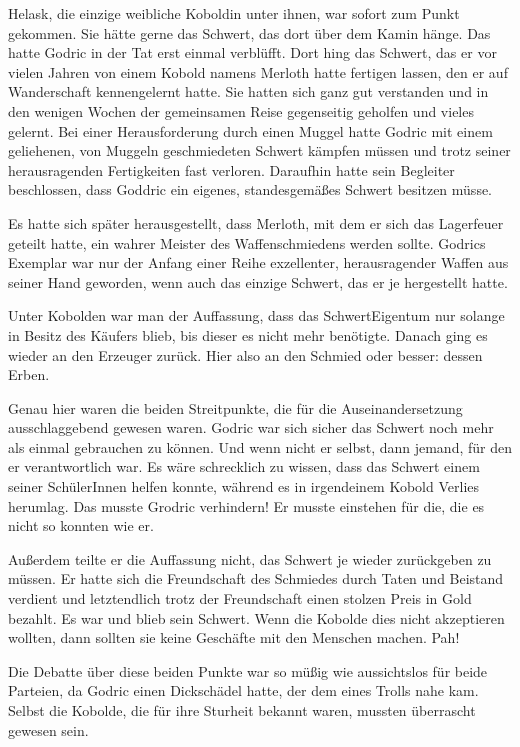 \documentclass[fontsize=12pt]{scrartcl}
\begin{document}
	Helask, die einzige weibliche Koboldin unter ihnen, war sofort zum Punkt gekommen. Sie hätte gerne das Schwert, das dort über dem Kamin hänge. Das hatte Godric in der Tat erst einmal verblüfft. Dort hing das Schwert, das er vor vielen Jahren von einem Kobold namens Merloth hatte fertigen lassen, den er auf Wanderschaft kennengelernt hatte. Sie hatten sich ganz gut verstanden und in den wenigen Wochen der gemeinsamen Reise gegenseitig geholfen und vieles gelernt. Bei einer Herausforderung durch einen Muggel hatte Godric mit einem geliehenen, von Muggeln geschmiedeten Schwert kämpfen müssen und trotz seiner herausragenden Fertigkeiten fast verloren. Daraufhin hatte sein Begleiter beschlossen, dass Goddric ein eigenes, standesgemäßes Schwert besitzen müsse. 
	
	Es hatte sich später herausgestellt, dass Merloth, mit dem er sich das Lagerfeuer geteilt hatte, ein wahrer Meister des Waffenschmiedens werden sollte. Godrics Exemplar war nur der Anfang einer Reihe exzellenter, herausragender Waffen aus seiner Hand geworden, wenn auch das einzige Schwert, das er je hergestellt hatte. 
	
	Unter Kobolden war man der Auffassung, dass das SchwertEigentum nur solange in Besitz des Käufers blieb, bis dieser es nicht mehr benötigte. Danach ging es wieder an den Erzeuger zurück. Hier also an den Schmied oder besser: dessen Erben. 
	
	Genau hier waren die beiden Streitpunkte, die für die Auseinandersetzung ausschlaggebend gewesen waren. Godric war sich sicher das Schwert noch mehr als einmal gebrauchen zu können. Und wenn nicht er selbst, dann jemand, für den er verantwortlich war. Es wäre schrecklich zu wissen, dass das Schwert einem seiner SchülerInnen helfen konnte, während es in irgendeinem Kobold Verlies herumlag. Das musste Grodric verhindern! Er musste einstehen für die, die es nicht so konnten wie er. 
	
	Außerdem teilte er die Auffassung nicht, das Schwert je wieder zurückgeben zu müssen. Er hatte sich die Freundschaft des Schmiedes durch Taten und Beistand verdient und letztendlich trotz der Freundschaft einen stolzen Preis in Gold bezahlt. Es war und blieb sein Schwert. Wenn die Kobolde dies nicht akzeptieren wollten, dann sollten sie keine Geschäfte mit den Menschen machen. Pah!
	
	Die Debatte über diese beiden Punkte war so müßig wie aussichtslos für beide Parteien, da Godric einen Dickschädel hatte, der dem eines Trolls nahe kam. Selbst die Kobolde, die für ihre Sturheit bekannt waren, mussten überrascht gewesen sein. 
	
\end{document}
